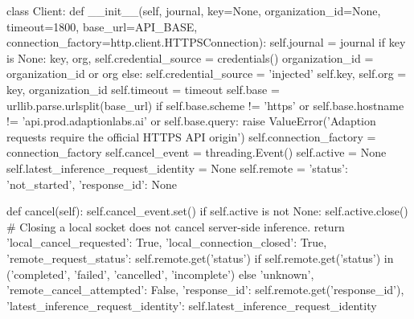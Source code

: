 {class Client:
    def __init__(self, journal, key=None, organization_id=None, timeout=1800, base_url=API_BASE,
                 connection_factory=http.client.HTTPSConnection):
        self.journal = journal
        if key is None:
            key, org, self.credential_source = credentials()
            organization_id = organization_id or org
        else:
            self.credential_source = 'injected'
        self.key, self.org = key, organization_id
        self.timeout = timeout
        self.base = urllib.parse.urlsplit(base_url)
        if self.base.scheme != 'https' or self.base.hostname != 'api.prod.adaptionlabs.ai' or self.base.query:
            raise ValueError('Adaption requests require the official HTTPS API origin')
        self.connection_factory = connection_factory
        self.cancel_event = threading.Event()
        self.active = None
        self.latest_inference_request_identity = None
        self.remote = {'status': 'not_started', 'response_id': None}

    def cancel(self):
        self.cancel_event.set()
        if self.active is not None:
            self.active.close()
        # Closing a local socket does not cancel server-side inference.
        return {'local_cancel_requested': True, 'local_connection_closed': True,
                'remote_request_status': self.remote.get('status') if self.remote.get('status') in
                ('completed', 'failed', 'cancelled', 'incomplete') else 'unknown',
                'remote_cancel_attempted': False, 'response_id': self.remote.get('response_id'),
                'latest_inference_request_identity': self.latest_inference_request_identity}

}

